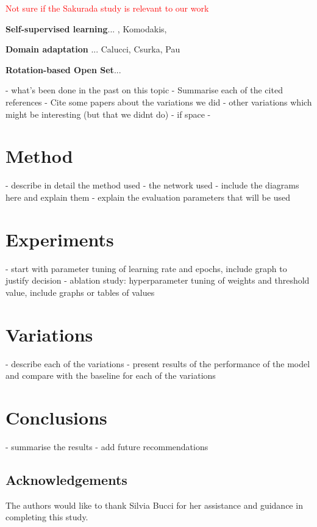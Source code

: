\documentclass[10pt,twocolumn,letterpaper]{article}
\begin{document}
\textcolor{red}{Not sure if the Sakurada study is relevant to our work}


\textbf{Self-supervised learning}...
\cite{Xu2019}, Komodakis, 

\textbf{Domain adaptation} ...
Calucci, Csurka, Pau

\textbf{Rotation-based Open Set}...
\cite{Bucci2020}

- what's been done in the past on this topic
 - Summarise each of the cited references
- Cite some papers about the variations we did
 - other variations which might be interesting (but that we didnt do) - if space
- 

\section{Method}
\label{sec:method}

- describe in detail the method used
- the network used
- include the diagrams here and explain them
- explain the evaluation parameters that will be used

\section{Experiments}
\label{sec:experiments}

- start with parameter tuning of learning rate and epochs, include graph to justify decision
- ablation study: hyperparameter tuning of weights and threshold value, include graphs or tables of values


\section{Variations}
\label{sec:variations}

- describe each of the variations
- present results of the performance of the model and compare with the baseline for each of the variations

\section{Conclusions}
\label{sec:conclusion}

- summarise the results
- add future recommendations

\subsection{Acknowledgements}
The authors would like to thank Silvia Bucci for her assistance and guidance in completing this study.


{\small


}
\end{document}
